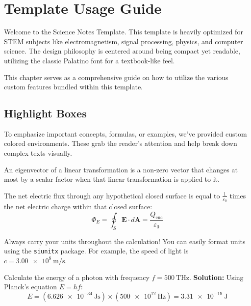 \chapter{Template Usage Guide}

Welcome to the Science Notes Template. This template is heavily optimized for STEM subjects like electromagnetism, signal processing, physics, and computer science. The design philosophy is centered around being compact yet readable, utilizing the classic Palatino font for a textbook-like feel.

This chapter serves as a comprehensive guide on how to utilize the various custom features bundled within this template.

\section{Highlight Boxes}
To emphasize important concepts, formulas, or examples, we've provided custom colored environments. These grab the reader's attention and help break down complex texts visually.

\begin{definition}[Eigenvector]
An eigenvector of a linear transformation is a non-zero vector that changes at most by a scalar factor when that linear transformation is applied to it.
\end{definition}

\begin{theorem}
The net electric flux through any hypothetical closed surface is equal to $\frac{1}{\varepsilon_0}$ times the net electric charge within that closed surface:
\begin{equation}
    \Phi_E = \oint_S \mathbf{E} \cdot d\mathbf{A} = \frac{Q_{\text{enc}}}{\varepsilon_0}
\end{equation}
\end{theorem}

\begin{important}
Always carry your units throughout the calculation! You can easily format units using the \texttt{siunitx} package. For example, the speed of light is $c = \SI{3.00e8}{\meter\per\second}$.
\end{important}

\begin{example}
Calculate the energy of a photon with frequency $f = \SI{500}{\tera\hertz}$.
\textbf{Solution:} Using Planck's equation $E = hf$:
\[ E = (\SI{6.626e-34}{\joule\second}) \times (\SI{500e12}{\hertz}) = \SI{3.31e-19}{\joule} \]
\end{example}


